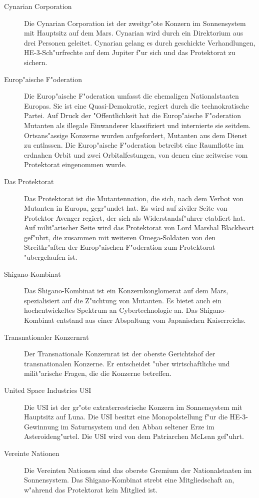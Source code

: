 
\begin{description}
\item [Cynarian Corporation] Die Cynarian Corporation ist der zweitgr"o\3te Konzern im Sonnensystem mit Hauptsitz auf dem Mars. Cynarian wird 
      durch ein Direktorium aus drei Personen geleitet. Cynarian gelang es durch geschickte Verhandlungen, HE-3-Sch"urfrechte auf dem Jupiter f"ur sich und das Protektorat zu sichern.
\item [Europ"aische F"oderation] Die Europ"aische F"oderation umfasst die ehemaligen Nationalstaaten Europas. Sie ist eine Quasi-Demokratie, 
      regiert durch die technokratische Partei. Auf Druck der "Offentlichkeit hat die Europ"aische F"oderation Mutanten als illegale Einwanderer klassifiziert und internierte sie seitdem. Ortsans"assige Konzerne wurden aufgefordert, Mutanten aus dem Dienst zu entlassen. Die Europ"aische F"oderation betreibt eine Raumflotte im erdnahen Orbit und zwei Orbitalfestungen, von denen eine zeitweise vom Protektorat eingenommen wurde.
\item [Das Protektorat] Das Protektorat ist die Mutantennation, die sich, nach dem Verbot von Mutanten in Europa, gegr"undet hat. Es wird 
      auf ziviler Seite von Protektor Avenger regiert, der sich als Widerstandsf"uhrer etabliert hat. Auf milit"arischer Seite wird das Protektorat von Lord Marshal Blackheart gef"uhrt, die zusammen mit weiteren Omega-Soldaten von den Streitkr"aften der Europ"aischen F"oderation zum Protektorat "ubergelaufen ist.
\item [Shigano-Kombinat] Das Shigano-Kombinat ist ein Konzernkonglomerat auf dem Mars, spezialisiert auf die Z"uchtung von Mutanten. Es 
      bietet auch ein hochentwickeltes Spektrum an Cybertechnologie an. Das Shigano-Kombinat entstand aus einer Abspaltung vom Japanischen Kaiserreichs.
\item [Transnationaler Konzernrat] Der Transnationale Konzernrat ist der oberste Gerichtshof der transnationalen Konzerne. Er entscheidet 
      "uber wirtschaftliche und milit"arische Fragen, die die Konzerne betreffen.
\item [United Space Industries USI] Die USI ist der gr"o\3te extraterrestrische Konzern im Sonnensystem mit Hauptsitz auf Luna. Die USI 
      besitzt eine Monopolstellung f"ur die HE-3-Gewinnung im Saturnsystem und den Abbau seltener Erze im Asteroideng"urtel. Die USI wird von dem Patriarchen McLean gef"uhrt.
\item [Vereinte Nationen] Die Vereinten Nationen sind das oberste Gremium der Nationalstaaten im Sonnensystem. Das Shigano-Kombinat strebt 
      eine Mitgliedschaft an, w"ahrend das Protektorat kein Mitglied ist.
\end{description}

